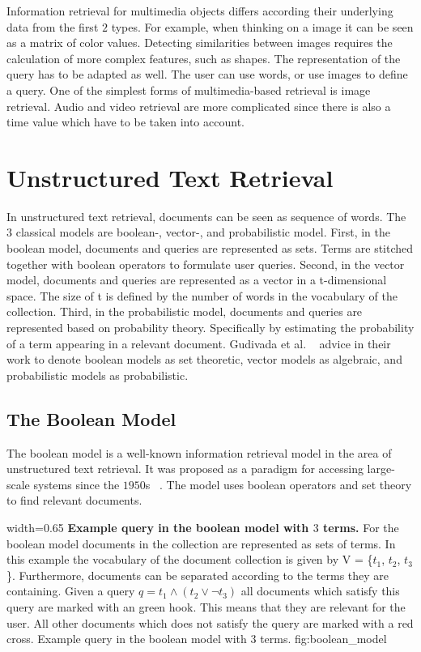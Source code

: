 Information retrieval for multimedia objects differs according their underlying data from the first $2$ types. For example, when thinking on a image it can be seen as a matrix of color values. Detecting similarities between images requires the calculation of more complex features, such as shapes. The representation of the query has to be adapted as well. The user can use words, or use images to define a query. One of the simplest forms of multimedia-based retrieval is image retrieval. Audio and video retrieval are more complicated since there is also a time value which have to be taken into account.

\section{Unstructured Text Retrieval}
\label{sec:unstructured_text_Retrieval}

In unstructured text retrieval, documents can be seen as sequence of words. The $3$ classical models are boolean-, vector-, and probabilistic model. First, in the boolean model, documents and queries are represented as sets. Terms are stitched together with boolean operators to formulate user queries. Second, in the vector model, documents and queries are represented as a vector in a t-dimensional space. The size of t is defined by the number of words in the vocabulary of the collection. Third, in the probabilistic model, documents and queries are represented based on probability theory. Specifically by estimating the probability of a term appearing in a relevant document. Gudivada et al. ~\cite{gudivada1997} advice in their work to denote boolean models as set theoretic, vector models as algebraic, and probabilistic models as probabilistic.

\subsection{The Boolean Model}
\label{sec:the_boolean_model}

The boolean model is a well-known information retrieval model in the area of unstructured text retrieval. It was proposed as a paradigm for accessing large-scale systems since the $1950$s ~\cite{Melucci2009}. The model uses boolean operators and set theory to find relevant documents.

      {width=0.65\textwidth}
      {\textbf{Example query in the boolean model with $3$ terms.} For the boolean model documents in the collection are represented as sets of terms. In this example the vocabulary of the document collection is given by V = \{$t_1$, $t_2$, $t_3$\}. Furthermore, documents can be separated according to the terms they are containing. Given a query $q=t_1 \wedge (t_2 \vee \neg t_3)$ all documents which satisfy this query are marked with an green hook. This means that they are relevant for the user. All other documents which does not satisfy the query are marked with a red cross.}
      {Example query in the boolean model with $3$ terms.}
      {fig:boolean_model}


